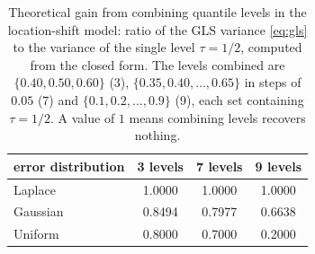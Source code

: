 \begin{table}[ht]
\centering
\small
\caption{Theoretical gain from combining quantile levels in the location-shift model: ratio of the GLS variance \eqref{eq:gls} to the variance of the single level $\tau=1/2$, computed from the closed form. The levels combined are $\{0.40,0.50,0.60\}$ (3), $\{0.35,0.40,\dots,0.65\}$ in steps of $0.05$ (7) and $\{0.1,0.2,\dots,0.9\}$ (9), each set containing $\tau=1/2$. A value of $1$ means combining levels recovers nothing.}
\label{tab:gls}
\begin{tabular}{lccc}
\toprule
error distribution & 3 levels & 7 levels & 9 levels \\
\midrule
Laplace & 1.0000 & 1.0000 & 1.0000 \\
Gaussian & 0.8494 & 0.7977 & 0.6638 \\
Uniform & 0.8000 & 0.7000 & 0.2000 \\
\bottomrule
\end{tabular}
\end{table}
